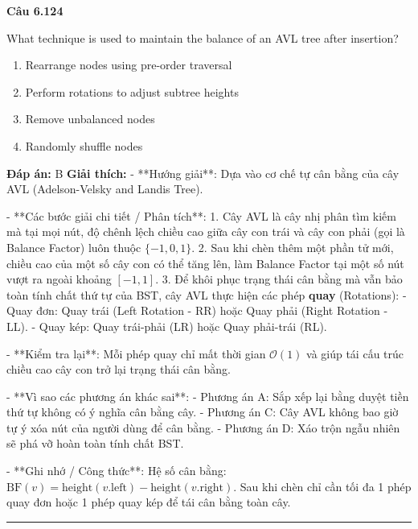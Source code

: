 \documentclass[11pt,a4paper]{article}
\newenvironment{question}[1]{%
  \par\vspace{1em}\noindent\textbf{\large Câu #1}\par\vspace{0.4em}
}{%
  \par\vspace{1em}\hrule\vspace{0.6em}
}
\newenvironment{choices}{%
  \begin{enumerate}[label=\textbf{\Alph*.},leftmargin=2.2em,itemsep=2pt,topsep=3pt]
}{%
  \end{enumerate}
}
\newcommand{\choice}{\item}
\begin{document}
\begin{question}{6.124}
What technique is used to maintain the balance of an AVL tree after insertion?
\begin{choices}
\choice Rearrange nodes using pre-order traversal
\choice Perform rotations to adjust subtree heights
\choice Remove unbalanced nodes
\choice Randomly shuffle nodes
\end{choices}
\textbf{Đáp án:} B
\textbf{Giải thích:} - **Hướng giải**:
Dựa vào cơ chế tự cân bằng của cây AVL (Adelson-Velsky and Landis Tree).


- **Các bước giải chi tiết / Phân tích**:
1. Cây AVL là cây nhị phân tìm kiếm mà tại mọi nút, độ chênh lệch chiều cao giữa cây con trái và cây con phải (gọi là Balance Factor) luôn thuộc \(\{-1, 0, 1\}\).
2. Sau khi chèn thêm một phần tử mới, chiều cao của một số cây con có thể tăng lên, làm Balance Factor tại một số nút vượt ra ngoài khoảng \([-1, 1]\).
3. Để khôi phục trạng thái cân bằng mà vẫn bảo toàn tính chất thứ tự của BST, cây AVL thực hiện các phép \textbf{quay} (Rotations):
   - Quay đơn: Quay trái (Left Rotation - RR) hoặc Quay phải (Right Rotation - LL).
   - Quay kép: Quay trái-phải (LR) hoặc Quay phải-trái (RL).


- **Kiểm tra lại**:
Mỗi phép quay chỉ mất thời gian \(\mathcal{O}(1)\) và giúp tái cấu trúc chiều cao cây con trở lại trạng thái cân bằng.


- **Vì sao các phương án khác sai**:
- Phương án A: Sắp xếp lại bằng duyệt tiền thứ tự không có ý nghĩa cân bằng cây.
- Phương án C: Cây AVL không bao giờ tự ý xóa nút của người dùng để cân bằng.
- Phương án D: Xáo trộn ngẫu nhiên sẽ phá vỡ hoàn toàn tính chất BST.


- **Ghi nhớ / Công thức**:
Hệ số cân bằng: \(\mathrm{BF}(v) = \mathrm{height}(v.\text{left}) - \mathrm{height}(v.\text{right})\). Sau khi chèn chỉ cần tối đa 1 phép quay đơn hoặc 1 phép quay kép để tái cân bằng toàn cây.
\end{question}
\end{document}
